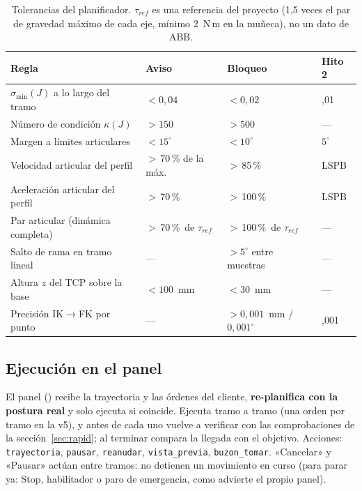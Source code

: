 \documentclass[10pt,a4paper]{article}
\DeclareRobustCommand{\ruta}[1]{\path{#1}}
\begin{document}
\begin{table}[H]
\centering\small
\renewcommand{\arraystretch}{1.15}
\begin{tabularx}{\textwidth}{@{}>{\raggedright\arraybackslash}X>{\raggedright\arraybackslash}p{3.1cm}>{\raggedright\arraybackslash}p{3.1cm}>{\raggedright\arraybackslash}p{2.0cm}@{}}
\toprule
\textbf{Regla} & \textbf{Aviso} & \textbf{Bloqueo} & \textbf{Hito 2}\\
\midrule
$\sigma_{\min}(J)$ a lo largo del tramo & $<0{,}04$ & $<0{,}02$ & 0,01\\
Número de condición $\kappa(J)$ & $>150$ & $>500$ & ---\\
Margen a límites articulares & $<15^\circ$ & $<10^\circ$ & $5^\circ$\\
Velocidad articular del perfil & $>$\,70\,\% de la máx. & $>$\,85\,\% & LSPB\\
Aceleración articular del perfil & $>$\,70\,\% & $>$\,100\,\% & LSPB\\
Par articular (dinámica completa) & $>$\,70\,\%\ de $\tau_{ref}$ & $>$\,100\,\%\ de $\tau_{ref}$ & ---\\
Salto de rama en tramo lineal & --- & $>5^\circ$ entre muestras & ---\\
Altura $z$ del TCP sobre la base & $<100$~mm & $<30$~mm & ---\\
Precisión IK$\to$FK por punto & --- & $>0{,}001$~mm / $0{,}001^\circ$ & 0,001\\
\bottomrule
\end{tabularx}
\caption{Tolerancias del planificador. $\tau_{ref}$ es una referencia del proyecto (1,5 veces el par de gravedad máximo de cada eje, mínimo 2~N\,m en la muñeca), no un dato de ABB.}
\label{tab:tolTray}
\end{table}

\subsection{Ejecución en el panel}
El panel (\ruta{panel/trayectoria.py}) recibe la trayectoria y las órdenes del cliente, \textbf{re-planifica con la postura real} y solo ejecuta si coincide. Ejecuta tramo a tramo (una orden por tramo en la v5), y antes de cada uno vuelve a verificar con las comprobaciones de la sección~\ref{sec:rapid}; al terminar compara la llegada con el objetivo. Acciones: \texttt{trayectoria}, \texttt{pausar}, \texttt{reanudar}, \texttt{vista\_previa}, \texttt{buzon\_tomar}. «Cancelar» y «Pausar» actúan entre tramos: no detienen un movimiento en curso (para parar ya: Stop, habilitador o paro de emergencia, como advierte el propio panel).
\end{document}
